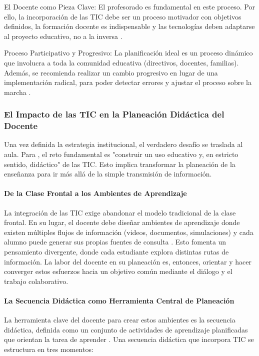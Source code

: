 El Docente como Pieza Clave: El profesorado es fundamental en este proceso. Por ello, la incorporación de las TIC debe ser un proceso motivador con objetivos definidos, la formación docente es indispensable y las tecnologías deben adaptarse al proyecto educativo, no a la inversa \cite{laia2014}.

Proceso Participativo y Progresivo: La planificación ideal es un proceso dinámico que involucra a toda la comunidad educativa (directivos, docentes, familias). Además, se recomienda realizar un cambio progresivo en lugar de una implementación radical, para poder detectar errores y ajustar el proceso sobre la marcha \cite{laia2014}.

\subsubsection{El Impacto de las TIC en la Planeación Didáctica del Docente}

Una vez definida la estrategia institucional, el verdadero desafío se traslada al aula. Para \textcite{diazangel2013}, el reto fundamental es "construir un uso educativo y, en estricto sentido, didáctico" de las TIC. Esto implica transformar la planeación de la enseñanza para ir más allá de la simple transmisión de información.

\paragraph{De la Clase Frontal a los Ambientes de Aprendizaje}

La integración de las TIC exige abandonar el modelo tradicional de la clase frontal. En su lugar, el docente debe diseñar ambientes de aprendizaje donde existen múltiples flujos de información (videos, documentos, simulaciones) y cada alumno puede generar sus propias fuentes de consulta \textcite{diazangel2013}. Esto fomenta un pensamiento divergente, donde cada estudiante explora distintas rutas de información. La labor del docente en su planeación es, entonces, orientar y hacer converger estos esfuerzos hacia un objetivo común mediante el diálogo y el trabajo colaborativo.

\paragraph{La Secuencia Didáctica como Herramienta Central de Planeación}

La herramienta clave del docente para crear estos ambientes es la secuencia didáctica, definida como un conjunto de actividades de aprendizaje planificadas que orientan la tarea de aprender \textcite{diazangel2013}. Una secuencia didáctica que incorpora TIC se estructura en tres momentos:

